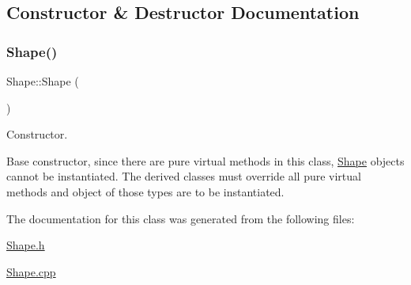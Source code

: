 \subsection{Constructor \& Destructor Documentation}
\mbox{\label{class_shape_aaa8d87171e65e0d8ba3c5459978992a7}} 
\subsubsection{\texorpdfstring{Shape()}{Shape()}}
{\footnotesize\ttfamily Shape\+::\+Shape (\begin{DoxyParamCaption}{ }\end{DoxyParamCaption})}



Constructor. 

Base constructor, since there are pure virtual methods in this class, \hyperlink{class_shape}{Shape} objects cannot be instantiated. The derived classes must override all pure virtual methods and object of those types are to be instantiated. 

The documentation for this class was generated from the following files\+:\begin{DoxyCompactItemize}
\item 
\hyperlink{_shape_8h}{Shape.\+h}\item 
\hyperlink{_shape_8cpp}{Shape.\+cpp}\end{DoxyCompactItemize}
